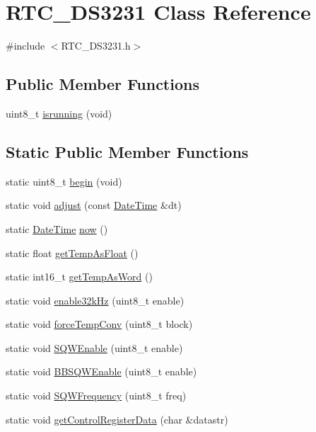 \hypertarget{class_r_t_c___d_s3231}{}\section{R\+T\+C\+\_\+\+D\+S3231 Class Reference}
\label{class_r_t_c___d_s3231}


{\ttfamily \#include $<$R\+T\+C\+\_\+\+D\+S3231.\+h$>$}

\subsection*{Public Member Functions}
\begin{DoxyCompactItemize}
\item 
uint8\+\_\+t \hyperlink{class_r_t_c___d_s3231_a771a62d39534f6689c17f7ebe42aaa34}{isrunning} (void)
\end{DoxyCompactItemize}
\subsection*{Static Public Member Functions}
\begin{DoxyCompactItemize}
\item 
static uint8\+\_\+t \hyperlink{class_r_t_c___d_s3231_ad15c2bb9d853cb1af41e8f35d7ea67db}{begin} (void)
\item 
static void \hyperlink{class_r_t_c___d_s3231_ae8d2a40c8ada023f5ab502a77631abb0}{adjust} (const \hyperlink{class_date_time}{Date\+Time} \&dt)
\item 
static \hyperlink{class_date_time}{Date\+Time} \hyperlink{class_r_t_c___d_s3231_adc740b28876022b852e0f33842632fab}{now} ()
\item 
static float \hyperlink{class_r_t_c___d_s3231_a0c97cca72e971f6b4d7d4a679eac8d5b}{get\+Temp\+As\+Float} ()
\item 
static int16\+\_\+t \hyperlink{class_r_t_c___d_s3231_aad9389d7a869971cde87fc81a8b00647}{get\+Temp\+As\+Word} ()
\item 
static void \hyperlink{class_r_t_c___d_s3231_ad892efd8d357db71da0c672523f6d699}{enable32k\+Hz} (uint8\+\_\+t enable)
\item 
static void \hyperlink{class_r_t_c___d_s3231_a63a667e5cb63ea406315bd42c2037eea}{force\+Temp\+Conv} (uint8\+\_\+t block)
\item 
static void \hyperlink{class_r_t_c___d_s3231_a3d54093b096bb5e68f03d66ee1c7e686}{S\+Q\+W\+Enable} (uint8\+\_\+t enable)
\item 
static void \hyperlink{class_r_t_c___d_s3231_a08fb5001c43fa4493d370a17ffb14737}{B\+B\+S\+Q\+W\+Enable} (uint8\+\_\+t enable)
\item 
static void \hyperlink{class_r_t_c___d_s3231_a85b06cbbd08d71865380e48183ddd26f}{S\+Q\+W\+Frequency} (uint8\+\_\+t freq)
\item 
static void \hyperlink{class_r_t_c___d_s3231_a2def91da84612846ecaa3029f8c3b9aa}{get\+Control\+Register\+Data} (char \&datastr)
\end{DoxyCompactItemize}



